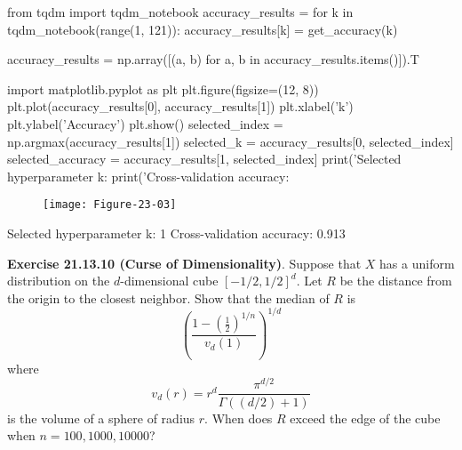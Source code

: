 \begin{python}
from tqdm import tqdm_notebook
accuracy_results = {}
for k in tqdm_notebook(range(1, 121)):
    accuracy_results[k] = get_accuracy(k)
    
accuracy_results = np.array([(a, b) for a, b in accuracy_results.items()]).T
\end{python}

\begin{python}
import matplotlib.pyplot as plt
plt.figure(figsize=(12, 8))
plt.plot(accuracy_results[0], accuracy_results[1])
plt.xlabel('k')
plt.ylabel('Accuracy')
plt.show()
selected_{i}ndex = np.argmax(accuracy_results[1])
selected_{k} = accuracy_results[0, selected_{i}ndex]
selected_accuracy = accuracy_results[1, selected_{i}ndex]
print('Selected hyperparameter k: %
print('Cross-validation accuracy: %
\end{python}

\begin{figure}[H]
\centering
\texttt{[image: Figure-23-03]}
\end{figure}

\begin{console}
Selected hyperparameter k: 1
Cross-validation accuracy: 0.913
\end{console}

\textbf{Exercise 21.13.10 (Curse of Dimensionality)}. Suppose that \(X\)
has a uniform distribution on the \(d\)-dimensional cube
\([-1/2, 1/2]^{d}\). Let \(R\) be the distance from the origin to the
closest neighbor. Show that the median of \(R\) is
\[
\left( \frac{1 - \left(\frac{1}{2}\right)^{1/n}}{v_d(1)} \right)^{1/d}
\]
where
\[
v_d(r) = r^{d} \frac{\pi^{d/2}}{\Gamma((d/2) + 1)}
\]
is the volume of a sphere of radius \(r\). When does \(R\) exceed the
edge of the cube when \(n = 100, 1000, 10000\)?

